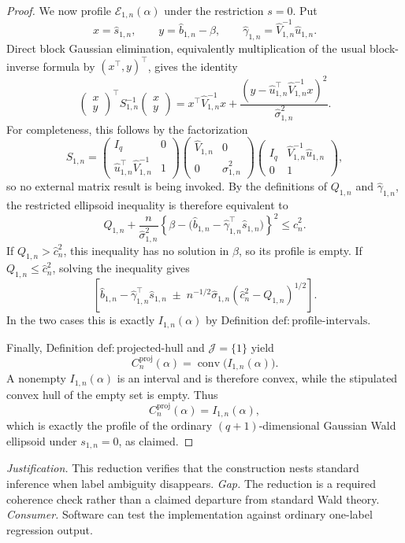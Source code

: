 \documentclass{article}
\begin{document}
\begin{proof}
We now profile \(\mathcal E_{1,n}(\alpha)\) under the restriction \(s=0\).  Put
\[
 x=\widehat s_{1,n},\qquad
 y=\widehat b_{1,n}-\beta,\qquad
 \widehat\gamma_{1,n}=\widehat V_{1,n}^{-1}\widehat u_{1,n}.
\]
Direct block Gaussian elimination, equivalently multiplication of the usual block-inverse formula by \((x^{\top},y)^{\top}\), gives the identity
\[
 \begin{pmatrix}x\\y\end{pmatrix}^{\!\top}
 S_{1,n}^{-1}
 \begin{pmatrix}x\\y\end{pmatrix}
 =x^{\top}\widehat V_{1,n}^{-1}x
  +\frac{(y-\widehat u_{1,n}^{\top}
                    \widehat V_{1,n}^{-1}x)^2}
         {\widehat\sigma_{1,n}^{2}}.
\]
For completeness, this follows by the factorization
\[
 S_{1,n}
 =\begin{pmatrix}I_q&0\\
       \widehat u_{1,n}^{\top}\widehat V_{1,n}^{-1}&1
   \end{pmatrix}
   \begin{pmatrix}\widehat V_{1,n}&0\\0&\widehat\sigma_{1,n}^{2}\end{pmatrix}
   \begin{pmatrix}I_q&\widehat V_{1,n}^{-1}\widehat u_{1,n}\\0&1
   \end{pmatrix},
\]
so no external matrix result is being invoked.  By the definitions of \(Q_{1,n}\) and \(\widehat\gamma_{1,n}\), the restricted ellipsoid inequality is therefore equivalent to
\[
 Q_{1,n}
 +\frac{n}{\widehat\sigma_{1,n}^{2}}
  \left\{\beta-
  \bigl(\widehat b_{1,n}
        -\widehat\gamma_{1,n}^{\top}\widehat s_{1,n}\bigr)
  \right\}^{2}
 \le \widehat c_n^2.
\]
If \(Q_{1,n}>\widehat c_n^2\), this inequality has no solution in \(\beta\), so its profile is empty.  If \(Q_{1,n}\le\widehat c_n^2\), solving the inequality gives
\[
 \left[
 \widehat b_{1,n}-\widehat\gamma_{1,n}^{\top}\widehat s_{1,n}
 \;\mathbin{\pm}\;
 n^{-1/2}\widehat\sigma_{1,n}
       (\widehat c_n^2-Q_{1,n})^{1/2}
 \right].
\]
In the two cases this is exactly \(I_{1,n}(\alpha)\) by Definition \(\mathrm{def:profile\text{-}intervals}\).

Finally, Definition \(\mathrm{def:projected\text{-}hull}\) and \(\mathcal J=\{1\}\) yield
\[
 C_n^{\mathrm{proj}}(\alpha)
   =\operatorname{conv}\bigl(I_{1,n}(\alpha)\bigr).
\]
A nonempty \(I_{1,n}(\alpha)\) is an interval and is therefore convex, while the stipulated convex hull of the empty set is empty.  Thus
\[
 C_n^{\mathrm{proj}}(\alpha)=I_{1,n}(\alpha),
\]
which is exactly the profile of the ordinary \((q+1)\)-dimensional Gaussian Wald ellipsoid under \(s_{1,n}=0\), as claimed.
\end{proof}
\par\smallskip\noindent \textit{Justification.} This reduction verifies that the construction nests standard inference when label ambiguity disappears. \textit{Gap.} The reduction is a required coherence check rather than a claimed departure from standard Wald theory. \textit{Consumer.} Software can test the implementation against ordinary one-label regression output.
\end{document}

